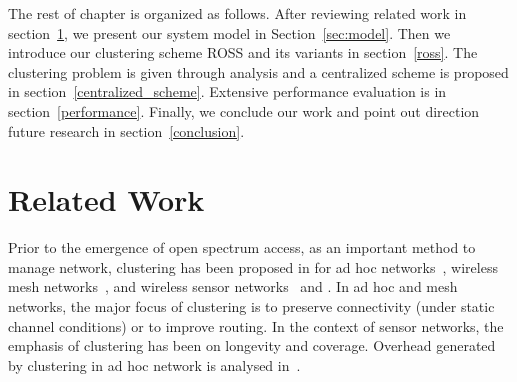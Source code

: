 \documentclass[journal,comsoc]{IEEEtran}
\theoremstyle{mytheoremstyle}
\theoremstyle{mytheoremstyle}
\theoremstyle{mytheoremstyle}
\begin{document}
The rest of chapter is organized as follows. 
After reviewing related work in section~\ref{related_work}, we present our system model in Section~\ref{sec:model}. 
Then we introduce our clustering scheme ROSS and its variants in section~\ref{ross}.
The clustering problem is given through analysis and a centralized scheme is proposed in section~\ref{centralized_scheme}.
Extensive performance evaluation is in section~\ref{performance}.
Finally, we conclude our work and point out direction future research in section~\ref{conclusion}.


\section{Related Work}
\label{related_work}

Prior to the emergence of open spectrum access, as an important method to manage network, clustering has been proposed in for ad hoc networks~\cite{Kawadia03,Lin97adaptiveclustering,Basagni99}, wireless mesh networks~\cite{Abbasi_survey_07}, and wireless sensor networks~\cite{Abbasi_survey_07} and . 
In ad hoc and mesh networks, the major focus of clustering is to preserve connectivity (under static channel conditions) or to improve routing.
In the context of sensor networks, the emphasis of clustering has been on longevity and coverage.
Overhead generated by clustering in ad hoc network is analysed in~\cite{clusterRoutingOverhead02infocom, clusterRoutingOverhead_wcnc04}.
\end{document}

